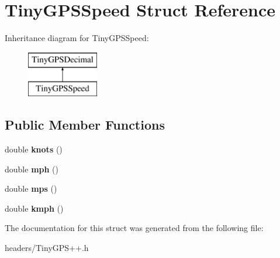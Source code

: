 \section{Tiny\+G\+P\+S\+Speed Struct Reference}
\label{struct_tiny_g_p_s_speed}
Inheritance diagram for Tiny\+G\+P\+S\+Speed\+:\begin{figure}[H]
\begin{center}
\leavevmode
\includegraphics[height=2.000000cm]{struct_tiny_g_p_s_speed}
\end{center}
\end{figure}
\subsection*{Public Member Functions}
\begin{DoxyCompactItemize}
\item 
double {\bfseries knots} ()\label{struct_tiny_g_p_s_speed_aa3a38ce4ece3d8062c794b73f260395e}

\item 
double {\bfseries mph} ()\label{struct_tiny_g_p_s_speed_a1809120167961ea9a85e860a964b1c6e}

\item 
double {\bfseries mps} ()\label{struct_tiny_g_p_s_speed_aacee536241e810cdf4ba7846d6c202cb}

\item 
double {\bfseries kmph} ()\label{struct_tiny_g_p_s_speed_a7fee3c8f9f2fcc5f4a517bd6108f79dd}

\end{DoxyCompactItemize}


The documentation for this struct was generated from the following file\+:\begin{DoxyCompactItemize}
\item 
headers/Tiny\+G\+P\+S++.\+h\end{DoxyCompactItemize}
